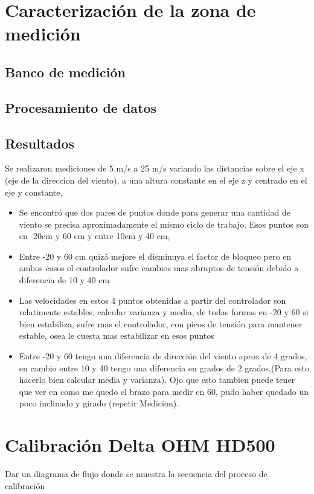 \section{Caracterización de la zona de medición}
\subsection{Banco de medición}
\subsection{Procesamiento de datos}
\subsection{Resultados}


Se realizaron mediciones de 5 m/s a 25 m/s variando las distancias sobre el eje x (eje de la direccion del viento), a una altura constante en el eje z y centrado en el eje y constante, 

\begin{itemize}
    \item Se encontró que dos pares de puntos donde para generar una cantidad de viento se precisa aproximadamente el mismo ciclo de trabajo. Esos puntos son en -20cm y 60 cm y entre 10cm y 40 cm, 
    \item Entre -20 y 60 cm quizá mejore el disminuya el factor de bloqueo pero en ambos casos el controlador sufre cambios mas abruptos de tensión debido a diferencia de 10 y 40 cm
    \item Las velocidades en estos 4 puntos obtenidas a partir del controlador son relatimente estables, calcular varianza y media, de todas formas en -20 y 60 si bien estabiliza, sufre mas el controlador, con picos de tensión para mantener estable, osea le cuesta mas estabilizar en esos puntos
    \item Entre -20 y 60 tengo una diferencia de dirección del  viento aprox de  4 grados, en cambio entre 10 y 40 tengo una diferencia en grados de 2 grados,(Para esto hacerlo bien calcular media y varianza). Ojo que esto tambien puede tener que ver en como me quedo el brazo para medir en 60, pudo haber quedado un poco inclinado y girado (repetir Medicion).
\end{itemize}

\section{Calibración Delta OHM HD500}
Dar un diagrama de flujo donde se muestra la secuencia del proceso de calibración



